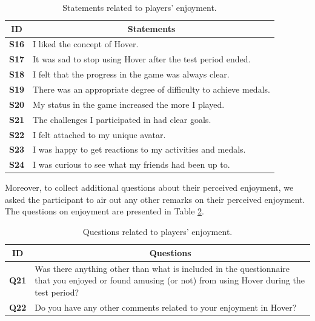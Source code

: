 \begin{table}[H]
    \centering
    \begin{tabularx}{0.95\textwidth}{|c|X|}
        \hline
        \textbf{ID} & \multicolumn{1}{c|}{\textbf{Statements}} \\ \hline
        \textbf{S16} & I liked the concept of Hover. \\
        \textbf{S17} & It was sad to stop using Hover after the test period ended. \\
        \textbf{S18} & I felt that the progress in the game was always clear. \\
        \textbf{S19} & There was an appropriate degree of difficulty to achieve medals. \\
        \textbf{S20} & My status in the game increased the more I played. \\
        \textbf{S21} & The challenges I participated in had clear goals. \\
        \textbf{S22} & I felt attached to my unique avatar. \\
        \textbf{S23} & I was happy to get reactions to my activities and medals. \\
        \textbf{S24} & I was curious to see what my friends had been up to. \\
         \hline
    \end{tabularx}
    \caption{Statements related to players' enjoyment.}
    \label{tab:player_enjoyment_statements}
\end{table}

Moreover, to collect additional questions about their perceived enjoyment, we asked the participant to air out any other remarks on their perceived enjoyment. The questions on enjoyment are presented in Table \ref{tab:player_enjoyment_questions}.

\begin{table}[H]
    \centering
    \begin{tabularx}{0.95\textwidth}{|c|X|}
        \hline
        \textbf{ID} & \multicolumn{1}{c|}{\textbf{Questions}} \\ \hline
        \textbf{Q21} & Was there anything other than what is included in the questionnaire that you enjoyed or found amusing (or not) from using Hover during the test period? \\
        \textbf{Q22} & Do you have any other comments related to your enjoyment in Hover? \\ \hline
    \end{tabularx}
    \caption{Questions related to players' enjoyment.}
    \label{tab:player_enjoyment_questions}
\end{table}

